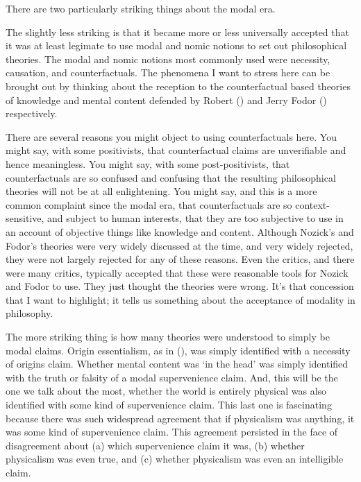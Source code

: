 \documentclass[
  10pt,
  letterpaper,
  DIV=11,
  numbers=noendperiod,
  twoside]{scrartcl}
\begin{document}
There are two particularly striking things about the modal era.

The slightly less striking is that it became more or less universally
accepted that it was at least legimate to use modal and nomic notions to
set out philosophical theories. The modal and nomic notions most
commonly used were necessity, causation, and counterfactuals. The
phenomena I want to stress here can be brought out by thinking about the
reception to the counterfactual based theories of knowledge and mental
content defended by Robert
() and Jerry Fodor
() respectively.

There are several reasons you might object to using counterfactuals
here. You might say, with some positivists, that counterfactual claims
are unverifiable and hence meaningless. You might say, with some
post-positivists, that counterfactuals are so confused and confusing
that the resulting philosophical theories will not be at all
enlightening. You might say, and this is a more common complaint since
the modal era, that counterfactuals are so context-sensitive, and
subject to human interests, that they are too subjective to use in an
account of objective things like knowledge and content. Although
Nozick's and Fodor's theories were very widely discussed at the time,
and very widely rejected, they were not largely rejected for any of
these reasons. Even the critics, and there were many critics, typically
accepted that these were reasonable tools for Nozick and Fodor to use.
They just thought the theories were wrong. It's that concession that I
want to highlight; it tells us something about the acceptance of
modality in philosophy.

The more striking thing is how many theories were understood to simply
be modal claims. Origin essentialism, as in
(), was simply identified
with a necessity of origins claim. Whether mental content was `in the
head' was simply identified with the truth or falsity of a modal
supervenience claim. And, this will be the one we talk about the most,
whether the world is entirely physical was also identified with some
kind of supervenience claim. This last one is fascinating because there
was such widespread agreement that if physicalism was anything, it was
some kind of supervenience claim. This agreement persisted in the face
of disagreement about (a) which supervenience claim it was, (b) whether
physicalism was even true, and (c) whether physicalism was even an
intelligible claim.
\end{document}
